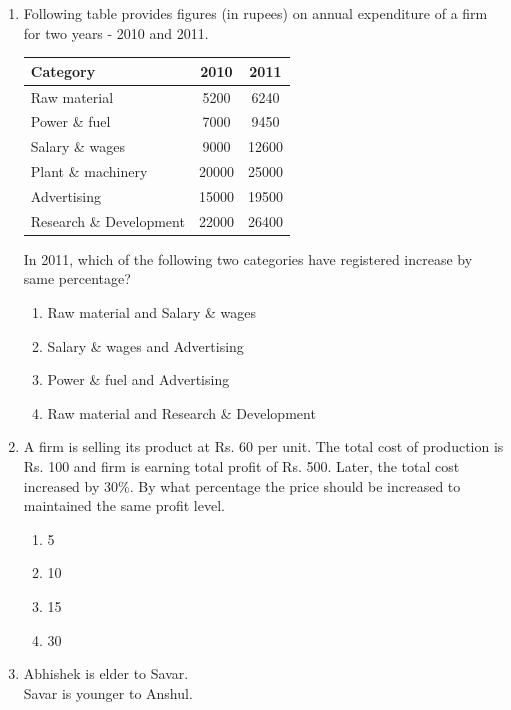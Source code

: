 \documentclass[14pt, a4paper]{extarticle}
\begin{document}
\begin{enumerate}[label=\textbf{Q. \arabic*}]
\begin{enumerate}[label=\textbf{Q.\arabic*}, start=61]
\item Following table provides figures (in rupees) on annual expenditure of a firm for two years - 2010 and 2011.
\begin{center}
\begin{tabular}{|l|c|c|}
\hline
\textbf{Category} & \textbf{2010} & \textbf{2011} \\
\hline
Raw material & 5200 & 6240 \\
\hline
Power \& fuel & 7000 & 9450 \\
\hline
Salary \& wages & 9000 & 12600 \\
\hline
Plant \& machinery & 20000 & 25000 \\
\hline
Advertising & 15000 & 19500 \\
\hline
Research \& Development & 22000 & 26400 \\
\hline
\end{tabular}
\end{center}
In 2011, which of the following two categories have registered increase by same percentage?
\begin{enumerate}
\item Raw material and Salary \& wages
\item Salary \& wages and Advertising
\item Power \& fuel and Advertising
\item Raw material and Research \& Development
\end{enumerate}

\item A firm is selling its product at Rs. 60 per unit. The total cost of production is Rs. 100 and firm is earning total profit of Rs. 500. Later, the total cost increased by 30\%. By what percentage the price should be increased to maintained the same profit level.
    \begin{multicols}{4}
        \begin{enumerate}
            \item 5
            \item 10
            \item 15
            \item 30
        \end{enumerate}
    \end{multicols}

    \item Abhishek is elder to Savar. \\
    Savar is younger to Anshul.
    \vspace{4mm}


\end{enumerate}
\end{enumerate}
\end{document}
